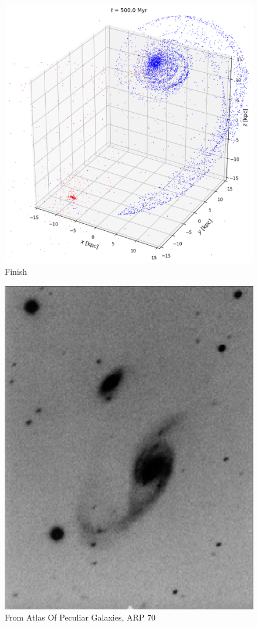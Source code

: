 \documentclass[linenumbers,RNAAS,trackchanges]{aastex631}
\begin{document}
\begin{figure}[H]
    \centering
    \includegraphics[scale=.40]{comparison_galaxy/ARP_70_output.png}
    \caption{Finish}
    \label{fig:code}
\end{figure}
\begin{figure}[H]
    \centering
    \includegraphics[scale=.50]{comparison_galaxy/arp_70.png}
    \caption{From Atlas Of Peculiar Galaxies, ARP 70}
    \label{fig:code}
\end{figure}
\end{document}

